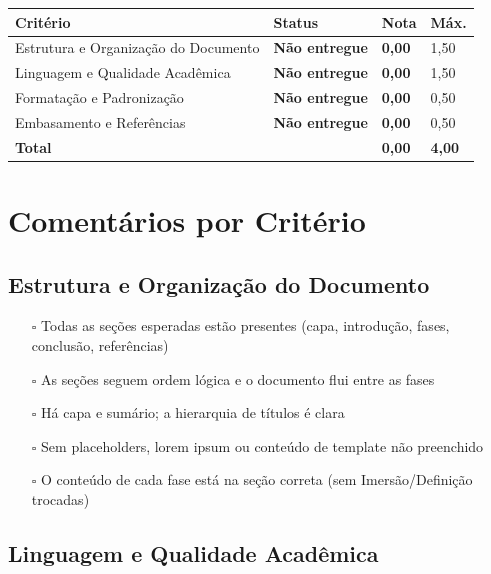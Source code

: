 \documentclass[
  sigconf,
  nonacm, %
  language=portuguese
]{acmart}
\newcommand{\statuswarn}[1]{{\small\bfseries\color{cwarn}#1}}
\begin{document}
\begin{tabular}{@{} L{2.6cm} C{2.5cm} C{1.1cm} C{1.1cm} @{}}
\toprule
\textbf{Critério} & \textbf{Status} & \textbf{Nota} & \textbf{Máx.} \\
\midrule
Estrutura e Organização do Documento & \statuswarn{Não entregue} & \textbf{0,00} & 1,50 \\
Linguagem e Qualidade Acadêmica & \statuswarn{Não entregue} & \textbf{0,00} & 1,50 \\
Formatação e Padronização & \statuswarn{Não entregue} & \textbf{0,00} & 0,50 \\
Embasamento e Referências & \statuswarn{Não entregue} & \textbf{0,00} & 0,50 \\
\midrule
\textbf{Total} & & \textbf{\color{cred}0,00} & \textbf{4,00} \\
\bottomrule
\end{tabular}

\section{Comentários por Critério}

\subsection{Estrutura e Organização do Documento}

\noindent\statuswarn{0,00\,/\,1,50 pts · Não entregue}

\begin{itemize}[leftmargin=14pt,itemsep=1pt,topsep=3pt,parsep=0pt]
  \item[$\square$] {\small\textcolor{cmuted}{Todas as seções esperadas estão presentes (capa, introdução, fases, conclusão, referências)}}
  \item[$\square$] {\small\textcolor{cmuted}{As seções seguem ordem lógica e o documento flui entre as fases}}
  \item[$\square$] {\small\textcolor{cmuted}{Há capa e sumário; a hierarquia de títulos é clara}}
  \item[$\square$] {\small\textcolor{cmuted}{Sem placeholders, lorem ipsum ou conteúdo de template não preenchido}}
  \item[$\square$] {\small\textcolor{cmuted}{O conteúdo de cada fase está na seção correta (sem Imersão/Definição trocadas)}}
\end{itemize}

\subsection{Linguagem e Qualidade Acadêmica}
\end{document}
